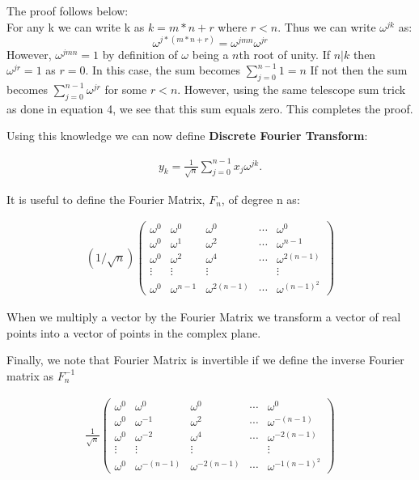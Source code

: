 \documentclass[DIV=calc, paper=a4, fontsize=11pt, twocolumn]{scrartcl}   %
\begin{document}
The proof follows below: \\

For any k we can write k as $k = m*n +r $ where $r < n$. Thus we can write $\omega^{jk}$ as: $$\omega^{j*(m*n+r)} = \omega^{jmn}\omega^{jr} $$ However, $\omega^{jmn}=1$ by definition of $\omega$ being a $n$th root of unity. If $n|k$ then $\omega^{jr} = 1$ as $r=0$. In this case, the sum becomes $\sum_{j=0}^{n-1}1=n$ If not then the sum becomes $\sum_{j=0}^{n-1}\omega^{jr}$ for some $r<n$. However, using the same telescope sum trick as done in equation 4, we see that this sum equals zero. This completes the proof.

\par Using this knowledge we can now define \textbf{Discrete Fourier Transform}:

\begin{align}
y_k = \frac{1}{\sqrt{n}}\sum_{j=0}^{n-1}x_j\omega^{jk}.
\end{align}

It is useful to define the Fourier Matrix, $F_{n}$, of degree n as:

\begin{align}
 (1/\sqrt n)
 \begin{pmatrix}
  \omega^0 & \omega^0 & \omega^0 & \cdots & \omega^0 \\
  \omega^0  & \omega^1 & \omega^2 &  \cdots &  \omega^{n-1} \\
   \omega^0  & \omega^2 & \omega^4 &  \cdots &  \omega^{2(n-1)} \\
  \vdots  & \vdots  & \vdots &   & \vdots  \\
  \omega^0  & \omega^{n-1} & \omega^{2(n-1)} & \cdots & \omega^{{(n-1)}^2}
 \end{pmatrix}
\end{align}

When we multiply a vector by the Fourier Matrix we transform a vector of real points into a vector of points in the complex plane.

\par Finally, we note that Fourier Matrix is invertible if we define the inverse Fourier matrix as $F_{n}^{-1}$

\begin{align}
\frac{1}{\sqrt n}
 \begin{pmatrix}
  \omega^0 & \omega^0 & \omega^0 & \cdots & \omega^0 \\
  \omega^0  & \omega^{-1} & \omega^2 &  \cdots &  \omega^{-(n-1)} \\
   \omega^0  & \omega^{-2} & \omega^4 &  \cdots &  \omega^{-2(n-1)} \\
  \vdots  & \vdots  & \vdots &   & \vdots  \\
  \omega^0  & \omega^{-(n-1)} & \omega^{-2(n-1)} & \cdots & \omega^{{-1(n-1)}^2}
 \end{pmatrix}
\end{align}
\end{document}

